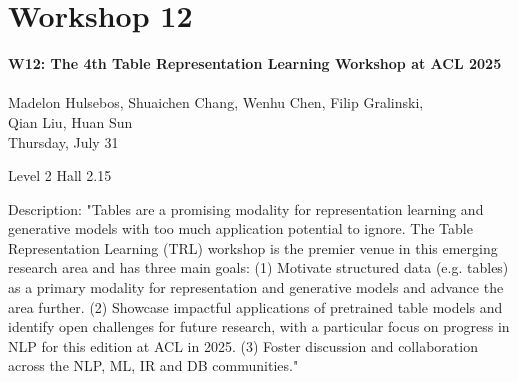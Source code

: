 \clearpage



\section[W12: The 4th Table Representation Learning \\
Workshop at ACL 2025]{Workshop 12}
\label{workshop_12}

\begin{center}
    {\Large \textbf{W12: The 4th Table Representation Learning Workshop at ACL 2025}}\\
    
\\
   Madelon Hulsebos, Shuaichen Chang, Wenhu Chen, Filip Gralinski, \\
   Qian Liu, Huan Sun\\

    Thursday, July 31
    
   Level 2 Hall 2.15

\end{center}

Description: "Tables are a promising modality for representation learning and generative models with too much application potential to ignore. The Table Representation Learning (TRL) workshop is the premier venue in this emerging research area and has three main goals:
(1) Motivate structured data (e.g. tables) as a primary modality for representation and generative models and advance the area further.
(2) Showcase impactful applications of pretrained table models and identify open challenges for future research, with a particular focus on progress in NLP for this edition at ACL in 2025.
(3) Foster discussion and collaboration across the NLP, ML, IR and DB communities."


